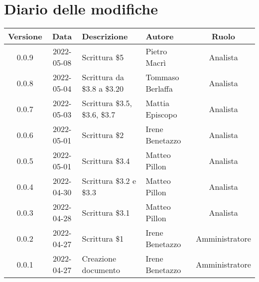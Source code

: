 \section*{Diario delle modifiche}
	\begin{center}
	\renewcommand{\arraystretch}{1.8} %
	\begin{tabular}{ |c|c|m{12em}|m{7em}|c| }
	\hline
	
	\textbf{Versione} & \textbf{Data} & \textbf{Descrizione} &  \textbf{Autore} &  \textbf{Ruolo} \\ %
	\hline
    0.0.9 & 2022-05-08 & Scrittura \$5 & Pietro Macrì & Analista\\
	\hline
    0.0.8 & 2022-05-04 & Scrittura da \$3.8 a \$3.20 & Tommaso \newline Berlaffa & Analista\\
    \hline
    0.0.7 & 2022-05-03 & Scrittura \$3.5, \$3.6, \$3.7 & Mattia \newline Episcopo & Analista\\
	\hline
    0.0.6 & 2022-05-01 & Scrittura \$2 & Irene Benetazzo & Analista\\
	\hline
    0.0.5 & 2022-05-01 & Scrittura \$3.4 & Matteo Pillon & Analista \\ %
	\hline
    0.0.4 & 2022-04-30 & Scrittura \$3.2 e \$3.3 & Matteo Pillon & Analista \\ %
	\hline
    0.0.3 & 2022-04-28 & Scrittura \$3.1 & Matteo Pillon & Analista \\ %
	\hline
    0.0.2 & 2022-04-27 & Scrittura \$1 & Irene Benetazzo & Amministratore\\ %
	\hline
    0.0.1 & 2022-04-27 & Creazione documento & Irene Benetazzo & Amministratore\\
	\hline
	\end{tabular}
	\end{center}
	\newpage